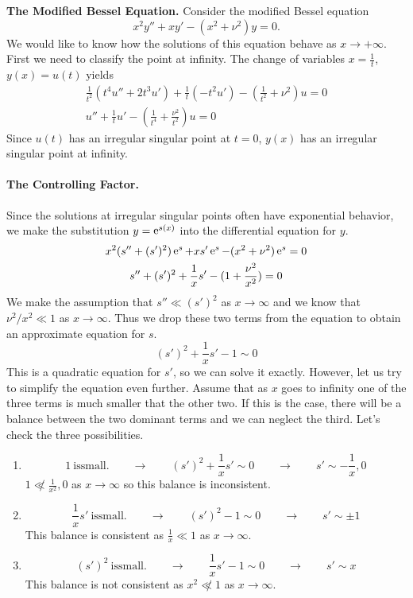 \begin{Example}\textbf{The Modified Bessel Equation.}
  Consider the modified Bessel equation
  \[ x^2 y'' + x y' - (x^2 + \nu^2) y = 0.\]
  We would like to know how the solutions of this equation behave as
  $x \to + \infty$.
  First we need to classify the point at infinity.  The change of variables
  $x = \frac{1}{t}$, $y(x) = u(t)$ yields
  \begin{gather*}
    \frac{1}{t^2}(t^4 u'' + 2t^3 u') + \frac{1}{t}(-t^2 u')
    - \left(\frac{1}{t^2} + \nu^2\right)u = 0 \\
    u'' + \frac{1}{t} u' - \left(\frac{1}{t^4} + \frac{\nu^2}{t^2}\right)u = 0
  \end{gather*}
  Since $u(t)$ has an irregular singular point at $t=0$, $y(x)$ has an
  irregular singular point at infinity.

  \paragraph{The Controlling Factor.}
  Since the solutions at irregular singular points often have 
  exponential behavior, we make
  the substitution $y = \mathop{\mathrm{e}}\nolimits^{s(x)}$ into the differential equation for $y$.
  \begin{gather*}
    x^2(s'' + (s')^2) \mathop{\mathrm{e}}\nolimits^s + x s' \mathop{\mathrm{e}}\nolimits^s - (x^2 + \nu^2) \mathop{\mathrm{e}}\nolimits^s = 0 \\
    s'' + (s')^2  + \frac{1}{x} s'  - (1 + \frac{\nu^2}{x^2}) = 0
  \end{gather*}
  We make the assumption that $s'' \ll (s')^2$ as $x \to \infty$ and we
  know that $\nu^2/x^2 \ll 1$ as $x \to \infty$.  Thus we drop these
  two terms from the equation to obtain an approximate equation for $s$.
  \[ (s')^2 + \frac{1}{x} s' - 1 \sim 0 \] 
  This is a quadratic equation for $s'$, so we can solve it exactly.  However,
  let us try to simplify the equation even further.  Assume that as $x$
  goes to infinity one of the three terms is much smaller that the other 
  two.  If this is the case, there will be a balance between the two
  dominant terms and we can neglect the third.
  Let's check the three possibilities.
  \begin{enumerate}
  \item 
    \[ 1\ \mathrm{is small.} \qquad \to \qquad
    (s')^2 + \frac{1}{x}s' \sim 0 \qquad \to \qquad 
    s' \sim - \frac{1}{x}, 0 \]  
    $1 \not\ll \frac{1}{x^2}, 0$ as $x \to \infty$ 
    so this balance is inconsistent.
  \item
    \[ \frac{1}{x} s'\ \mathrm{is small.} \qquad \to \qquad
    (s')^2 - 1 \sim 0 \qquad \to \qquad s' \sim \pm 1 \]
    This balance is consistent as $\frac{1}{x} \ll 1$ as $x \to \infty$.
  \item
    \[ (s')^2\ \mathrm{is small.} \qquad \to \qquad
    \frac{1}{x} s' - 1 \sim 0 \qquad \to \qquad s' \sim x \]
    This balance is not consistent as $x^2 \not\ll 1$ as $x \to \infty$.
  \end{enumerate}


\end{Example}
